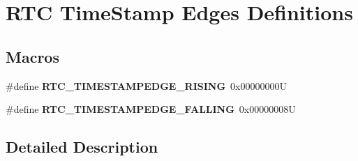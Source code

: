 \hypertarget{group___r_t_c_ex___time___stamp___edges__definitions}{}\section{R\+TC Time\+Stamp Edges Definitions}
\label{group___r_t_c_ex___time___stamp___edges__definitions}
\subsection*{Macros}
\begin{DoxyCompactItemize}
\item 
\mbox{\label{group___r_t_c_ex___time___stamp___edges__definitions_gaae434219f837fa77058fdbfc0a4b24d0}} 
\#define {\bfseries R\+T\+C\+\_\+\+T\+I\+M\+E\+S\+T\+A\+M\+P\+E\+D\+G\+E\+\_\+\+R\+I\+S\+I\+NG}~0x00000000U
\item 
\mbox{\label{group___r_t_c_ex___time___stamp___edges__definitions_ga5ddd88325303593d4fbaf29123037c95}} 
\#define {\bfseries R\+T\+C\+\_\+\+T\+I\+M\+E\+S\+T\+A\+M\+P\+E\+D\+G\+E\+\_\+\+F\+A\+L\+L\+I\+NG}~0x00000008U
\end{DoxyCompactItemize}


\subsection{Detailed Description}
